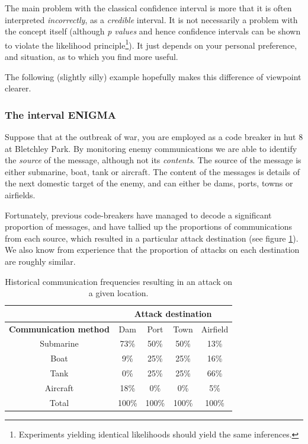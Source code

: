 \documentclass[11pt,fullpage]{book}
\begin{document}
The main problem with the classical confidence interval is more that it is often interpreted \textit{incorrectly}, as a \textit{credible} interval. It is not necessarily a problem with the concept itself (although \textit{p values} and hence confidence intervals can be shown to violate the likelihood principle\footnote{Experiments yielding identical likelihoods should yield the same inferences.}). It just depends on your personal preference, and situation, as to which you find more useful.

The following (slightly silly) example hopefully makes this difference of viewpoint clearer. 

\subsubsection{The interval ENIGMA}
Suppose that at the outbreak of war, you are employed as a code breaker in hut 8 at Bletchley Park. By monitoring enemy communications we are able to identify the \textit{source} of the message, although not its \textit{contents}. The source of the message is either submarine, boat, tank or aircraft. The content of the messages is details of the next domestic target of the enemy, and can either be dams, ports, towns or airfields.

Fortunately, previous code-breakers have managed to decode a significant proportion of messages, and have tallied up the proportions of communications from each source, which resulted in a particular attack destination (see figure \ref{tab:Posterior_confidenceIntervalHistoric}). We also know from experience that the proportion of attacks on each destination are roughly similar.


\begin{table}[htbp]
  \centering
    \begin{tabular}{ccccc}
    \toprule
          & \multicolumn{4}{c}{\textbf{Attack destination}} \\
    \midrule
    \textbf{Communication method} & Dam & Port & Town & Airfield \\
    Submarine & 73\%  & 50\%  & 50\%  & 13\% \\
    Boat  & 9\%   & 25\%  & 25\%  & 16\% \\
    Tank  & 0\%   & 25\%  & 25\%  & 66\% \\
    Aircraft & 18\%   & 0\%  & 0\%   & 5\% \\
    \bottomrule
    Total & 100\% & 100\% & 100\% & 100\% \\
    \end{tabular}%
  \caption{Historical communication frequencies resulting in an attack on a given location.}\label{tab:Posterior_confidenceIntervalHistoric}
\end{table}%
\end{document}
